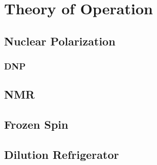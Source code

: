 \chapter{Theory of Operation} 
\label{theory}  
\section{Nuclear Polarization}  
 \subsection{DNP}

\section{NMR}

\section{Frozen Spin} 
 
\section{Dilution Refrigerator} 


